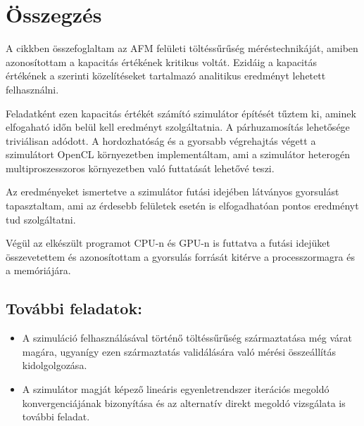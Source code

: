 \chapter{Összegzés}
	A cikkben összefoglaltam az AFM felületi töltéssűrűség méréstechnikáját, amiben azonosítottam a
	kapacitás értékének kritikus voltát. Ezidáig a kapacitás értékének a \cite{Hudlet1998,Butt20051}
	szerinti közelítéseket tartalmazó analitikus eredményt lehetett felhasználni.
	
	Feladatként ezen kapacitás értékét számító szimulátor építését tűztem ki, aminek elfogaható időn
	belül kell eredményt szolgáltatnia. A párhuzamosítás lehetősége triviálisan adódott.
	A hordozhatóság és a gyorsabb végrehajtás végett a szimulátort OpenCL 
	környezetben implementáltam, ami a szimulátor heterogén multiproszesszoros környezetben való
	futtatását lehetővé teszi.
	
	Az eredményeket ismertetve a szimulátor futási idejében látványos gyorsulást tapasztaltam, ami
	az érdesebb felületek esetén is elfogadhatóan pontos eredményt tud szolgáltatni. 

	Végül az elkészült programot CPU-n és GPU-n is futtatva a futási idejüket összevetettem és
	azonosítottam a gyorsulás forrását kitérve a processzormagra és a memóriájára.
	
	\section*{További feladatok:}
	\begin{itemize}
		\item A szimuláció felhasználásával történő töltéssűrűség származtatása még várat magára, ugyanígy ezen származtatás
		validálására való mérési összeállítás kidolgolgozása.
		\item A szimulátor magját képező lineáris egyenletrendszer iterációs megoldó konvergenciájának bizonyítása és az alternatív
		direkt megoldó vizsgálata is további feladat.
	\end{itemize}
	
	
	
	